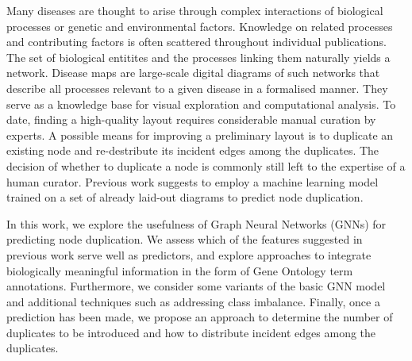 \documentclass[
	fontsize=10pt, %
	twoside=true, %
	secnumdepth=1, %
  toc=indentunnumbered %
]{kaobook}
\begin{document}
Many diseases are thought to arise through complex interactions of biological
processes or genetic and environmental factors.
Knowledge on related processes and contributing factors
is often scattered throughout individual publications.
%
The set of biological entitites and the processes linking them naturally yields
a network.
Disease maps are large-scale digital diagrams of such networks that
describe all processes relevant to a given disease in a formalised manner.
They serve as a
knowledge base for visual exploration and computational analysis.
%
To date, finding a high-quality layout requires considerable manual
curation by experts.
A possible means for improving a preliminary layout is to duplicate an
existing node and re-destribute its incident edges among the duplicates.
The decision of whether to duplicate a node is commonly still left to the
expertise of a human curator. Previous work
suggests to employ a machine learning
model trained on a set of already laid-out diagrams to predict node duplication.

In this work, we explore the usefulness of Graph Neural Networks (GNNs) for
predicting node duplication.
%
We assess which
of the features suggested in previous work
serve well as predictors,
%
and explore approaches to integrate biologically meaningful information in the
form of Gene Ontology term annotations.
%
Furthermore, we consider some variants of the basic GNN model and
additional techniques such as addressing class imbalance.
%
Finally, once a prediction has been made, we propose an approach to determine
the number of duplicates to be introduced and how to distribute incident edges
among the duplicates.
\end{document}
